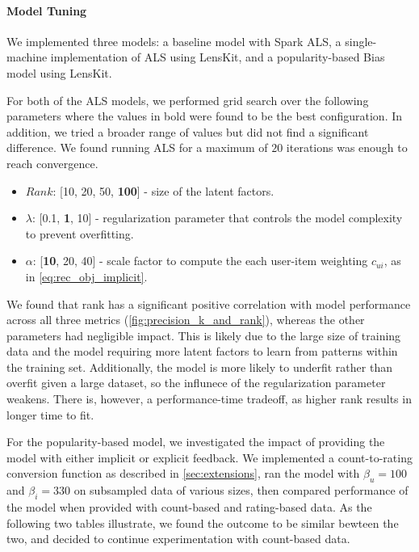\documentclass{article}
\begin{document}
\paragraph{Model Tuning} We implemented three models: a baseline model with Spark ALS, a single-machine implementation of ALS using LensKit, and a popularity-based Bias model using LensKit. 

For both of the ALS models, we performed grid search over the following parameters where the values in bold were found to be the best configuration. In addition, we tried a broader range of values but did not find a significant difference. We found running ALS for a maximum of $20$ iterations was enough to reach convergence.

\begin{itemize}
\item $Rank$: [10, 20, 50, \textbf{100}] - size of the latent factors.
\item $\lambda$: [0.1, \textbf{1}, 10] - regularization parameter that controls the model complexity to prevent overfitting.
\item $\alpha$: [\textbf{10}, 20, 40] - scale factor to compute the each user-item weighting $c_{ui}$, as in \cref{eq:rec_obj_implicit}.
\end{itemize}

We found that rank has a significant positive correlation with model performance across all three metrics (\cref{fig:precision_k_and_rank}), whereas the other parameters had negligible impact. This is likely due to the large size of training data and the model requiring more latent factors to learn from patterns within the training set. Additionally, the model is more likely to underfit rather than overfit given a large dataset, so the influnece of the regularization parameter weakens. There is, however, a performance-time tradeoff, as higher rank results in longer time to fit.

For the popularity-based model, we investigated the impact of providing the model with either implicit or explicit feedback. We implemented a count-to-rating conversion function as described in \cref{sec:extensions}, ran the model with $\beta_u=100$ and $\beta_i=330$ on subsampled data of various sizes, then compared performance of the model when provided with count-based and rating-based data.
As the following two tables illustrate, we found the outcome to be similar bewteen the two, and decided to continue experimentation with count-based data.
\end{document}
